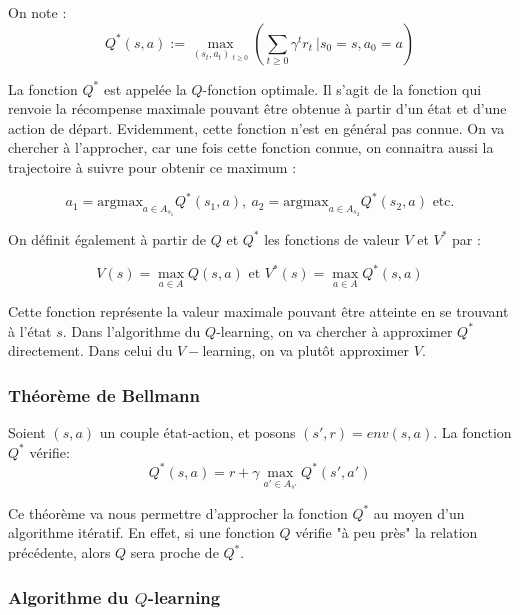 On note : 
$$
Q^{*}(s,a) := \max_{ (s_t,a_t)\ _{t\geq 0}}\left( \sum_{t\geq 0} \gamma^t r_t  \ \big | s_0=s,a_0=a\right)
$$

La fonction $Q^{*}$ est appelée la $Q$-fonction optimale. Il s'agit de la fonction qui renvoie la récompense maximale pouvant être obtenue à partir d'un état et d'une action de départ. Evidemment, cette fonction n'est en général pas connue. On va chercher à l'approcher, car une fois cette fonction connue, on connaitra aussi la trajectoire à suivre pour obtenir ce maximum :

$$
a_1 = \text{argmax}_{a\in A_{s_1}} Q^{*}(s_1,a), ~ a_2 = \text{argmax}_{a\in A_{s_2}} Q^{*}(s_2,a) \text{ etc}.
$$

On définit également à partir de $Q$ et $Q^*$ les fonctions de valeur $V$ et $V^*$ par : 

$$V(s)=\max_{a\in A} Q(s,a)\text{ et }V^*(s)=\max_{a\in A} Q^*(s,a)$$

Cette fonction représente la valeur maximale pouvant être atteinte en se trouvant à l'état $s$.  Dans l'algorithme du $Q$-learning, on va chercher à approximer $Q^*$ directement. Dans celui du $V-$learning, on va plutôt approximer $V$.


\subsubsection{Théorème de Bellmann}

Soient $(s,a)$ un couple état-action, et posons $(s',r)= env(s,a)$.  La fonction $Q^{*}$ vérifie:   
$$
Q^{*}(s,a) = r + \gamma \max_{a'\in A_{s'}} Q^{*}(s',a')
$$

Ce théorème va nous permettre d'approcher la fonction $Q^*$ au moyen d'un algorithme itératif. En effet, si une fonction $Q$ vérifie "à peu près" la relation précédente, alors $Q$ sera proche de $Q^*$. 

\subsubsection{Algorithme du $Q$-learning}

